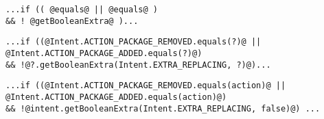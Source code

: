 \begin{lstlisting}[basicstyle=\small,caption={Example A of invocation of API \texttt{android.content.Intent.getBooleanExtra()} in \cite{id:Example12A}},label={ex:Example12A},10pt]
...if (( @equals@ || @equals@ )
&& ! @getBooleanExtra@ )...
\end{lstlisting}

\begin{lstlisting}[basicstyle=\small,caption={Example A of invocation of API \texttt{android.content.Intent.getBooleanExtra()} in \cite{id:Example12A}},label={ex:Example12A},10pt]
...if ((@Intent.ACTION_PACKAGE_REMOVED.equals(?)@ ||
@Intent.ACTION_PACKAGE_ADDED.equals(?)@)
&& !@?.getBooleanExtra(Intent.EXTRA_REPLACING, ?)@)... 
\end{lstlisting}

\begin{lstlisting}[basicstyle=\small,caption={Example A of invocation of API \texttt{android.content.Intent.getBooleanExtra()} in \cite{id:Example12A}},label={ex:Example12A},10pt]
...if ((@Intent.ACTION_PACKAGE_REMOVED.equals(action)@ ||
@Intent.ACTION_PACKAGE_ADDED.equals(action)@)
&& !@intent.getBooleanExtra(Intent.EXTRA_REPLACING, false)@) ...
\end{lstlisting}
